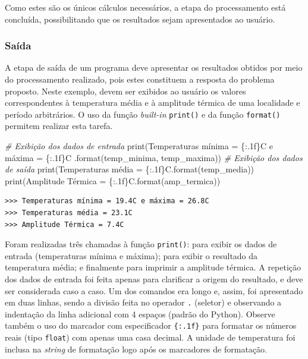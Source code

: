 \documentclass[
]{book}
\newenvironment{Shaded}{\begin{snugshade}}{\end{snugshade}}
\newcommand{\BuiltInTok}[1]{#1}
\newcommand{\CommentTok}[1]{\textcolor[rgb]{0.56,0.35,0.01}{\textit{#1}}}
\newcommand{\NormalTok}[1]{#1}
\newcommand{\SpecialCharTok}[1]{\textcolor[rgb]{0.00,0.00,0.00}{#1}}
\newcommand{\StringTok}[1]{\textcolor[rgb]{0.31,0.60,0.02}{#1}}
\begin{document}
Como estes são os únicos cálculos necessários, a etapa do processamento está concluída, possibilitando que os resultados sejam apresentados ao usuário.

\hypertarget{sauxedda}{%
\subsubsection{Saída}\label{sauxedda}}

A etapa de saída de um programa deve apresentar os resultados obtidos por meio do processamento realizado, pois estes constituem a resposta do problema proposto. Neste exemplo, devem ser exibidos ao usuário os valores correspondentes à temperatura média e à amplitude térmica de uma localidade e período arbitrários. O uso da função \emph{built-in} \texttt{print()} e da função \texttt{format()} permitem realizar esta tarefa.

\begin{Shaded}
\begin{Highlighting}[]
\CommentTok{\# Exibição dos dados de entrada}
\BuiltInTok{print}\NormalTok{(}\StringTok{\textquotesingle{}Temperaturas mínima = }\SpecialCharTok{\{:.1f\}}\StringTok{C e máxima = }\SpecialCharTok{\{:.1f\}}\StringTok{C\textquotesingle{}}
\NormalTok{    .}\BuiltInTok{format}\NormalTok{(temp\_minima, temp\_maxima))}
\CommentTok{\# Exibição dos dados de saída}
\BuiltInTok{print}\NormalTok{(}\StringTok{\textquotesingle{}Temperaturas média = }\SpecialCharTok{\{:.1f\}}\StringTok{C\textquotesingle{}}\NormalTok{.}\BuiltInTok{format}\NormalTok{(temp\_media))}
\BuiltInTok{print}\NormalTok{(}\StringTok{\textquotesingle{}Amplitude Térmica = }\SpecialCharTok{\{:.1f\}}\StringTok{C\textquotesingle{}}\NormalTok{.}\BuiltInTok{format}\NormalTok{(amp\_termica))}
\end{Highlighting}
\end{Shaded}

\begin{verbatim}
>>> Temperaturas mínima = 19.4C e máxima = 26.8C
>>> Temperaturas média = 23.1C
>>> Amplitude Térmica = 7.4C
\end{verbatim}

Foram realizadas três chamadas à função \texttt{print()}: para exibir os dados de entrada (temperaturas mínima e máxima); para exibir o resultado da temperatura média; e finalmente para imprimir a amplitude térmica. A repetição dos dados de entrada foi feita apenas para clarificar a origem do resultado, e deve ser considerada caso a caso. Um dos comandos era longo e, assim, foi apresentado em duas linhas, sendo a divisão feita no operador \texttt{.} (seletor) e observando a indentação da linha adicional com 4 espaços (padrão do Python). Observe também o uso do marcador com especificador \texttt{\{:.1f\}} para formatar os números reais (tipo \texttt{float}) com apenas uma casa decimal. A unidade de temperatura foi inclusa na \emph{string} de formatação logo após os marcadores de formatação.
\end{document}
